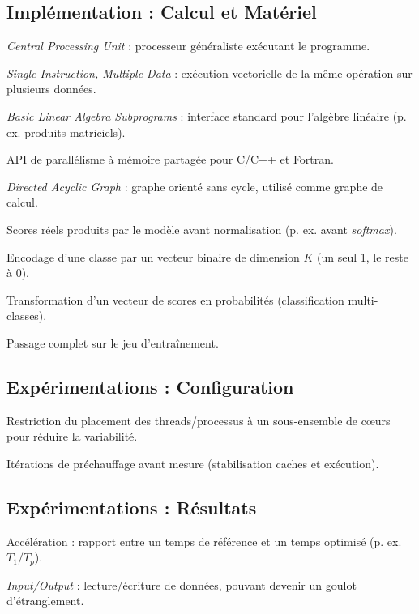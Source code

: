 \documentclass[a4paper,11pt]{article}
\begin{document}
\subsection*{Implémentation : Calcul et Matériel}
\begin{description}[style=multiline, leftmargin=3cm, font=\bfseries]
\item[CPU] \textit{Central Processing Unit} : processeur généraliste exécutant le programme.
\item[SIMD] \textit{Single Instruction, Multiple Data} : exécution vectorielle de la même opération sur plusieurs données.
\item[BLAS] \textit{Basic Linear Algebra Subprograms} : interface standard pour l'algèbre linéaire (p. ex. produits matriciels).
\item[OpenMP] API de parallélisme à mémoire partagée pour C/C++ et Fortran.
\item[DAG] \textit{Directed Acyclic Graph} : graphe orienté sans cycle, utilisé comme graphe de calcul.
\item[Logits] Scores réels produits par le modèle avant normalisation (p. ex. avant \textit{softmax}).
\item[One-hot] Encodage d'une classe par un vecteur binaire de dimension $K$ (un seul 1, le reste à 0).
\item[Softmax] Transformation d'un vecteur de scores en probabilités (classification multi-classes).
\item[Epoch] Passage complet sur le jeu d'entraînement.
\end{description}

\subsection*{Expérimentations : Configuration}
\begin{description}[style=multiline, leftmargin=3cm, font=\bfseries]
\item[Affinité CPU] Restriction du placement des threads/processus à un sous-ensemble de cœurs pour réduire la variabilité.
\item[Warm-up] Itérations de préchauffage avant mesure (stabilisation caches et exécution).
\end{description}

\subsection*{Expérimentations : Résultats}
\begin{description}[style=multiline, leftmargin=3cm, font=\bfseries]
\item[Speedup] Accélération : rapport entre un temps de référence et un temps optimisé (p. ex. $T_1/T_p$).
\item[I/O] \textit{Input/Output} : lecture/écriture de données, pouvant devenir un goulot d'étranglement.
\end{description}
\end{document}
